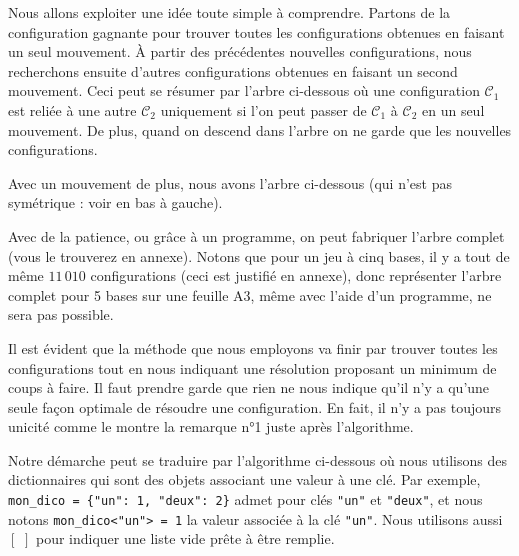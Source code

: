 Nous allons exploiter une idée toute simple à comprendre. Partons de la configuration gagnante pour trouver toutes les configurations obtenues en faisant un seul mouvement.
À partir des précédentes nouvelles configurations, nous recherchons ensuite d'autres configurations obtenues en faisant un second mouvement.
Ceci peut se résumer par l'arbre ci-dessous où une configuration $\mathcal{C}_1$ est reliée à une autre $\mathcal{C}_2$ uniquement si l'on peut passer de $\mathcal{C}_1$ à $\mathcal{C}_2$ en un seul mouvement. De plus, quand on descend dans l'arbre on ne garde que les nouvelles configurations.




Avec un mouvement de plus, nous avons l'arbre ci-dessous (qui n'est pas symétrique : voir en bas à gauche).




Avec de la patience, ou grâce à un programme, on peut fabriquer l'arbre complet (vous le trouverez en annexe). Notons que pour un jeu à cinq bases, il y a tout de même $11\,010$ configurations (ceci est justifié en annexe), donc représenter l'arbre complet pour 5 bases sur une feuille A3, même avec l'aide d'un programme, ne sera pas possible. 


\medskip

Il est évident que la méthode que nous employons va finir par trouver toutes les configurations tout en nous indiquant une résolution proposant un minimum de coups à faire.
Il faut prendre garde que rien ne nous indique qu'il n'y a qu'une seule façon optimale de résoudre une configuration. En fait, il n'y a pas toujours unicité comme le montre la remarque n°1 juste après l'algorithme. 


\medskip

Notre démarche peut se traduire par l'algorithme ci-dessous où nous utilisons des dictionnaires qui sont des objets associant une valeur à une clé. Par exemple, \verb+mon_dico = {"un": 1, "deux": 2}+ admet pour clés \verb+"un"+ et \verb+"deux"+, et nous notons \verb+mon_dico<"un"> = 1+ la valeur associée à la clé \verb+"un"+.
Nous utilisons aussi $[ \,\, ]$ pour indiquer une liste vide prête à être remplie.


\bigskip

